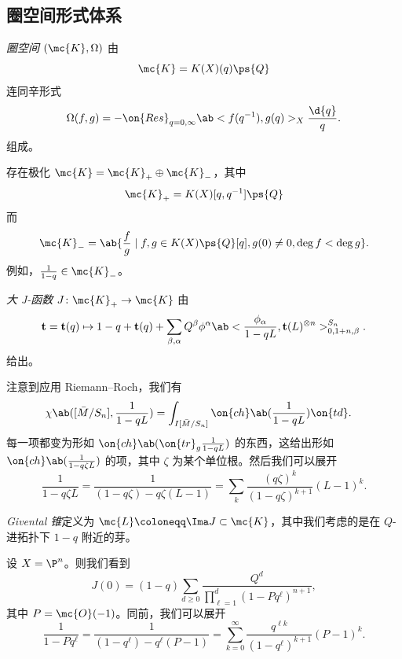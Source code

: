 \subsection{圈空间形式体系}%
\label{sub:Loop space formalism}

\begin{defn}
    \textit{圈空间} \((\mc{K}, \Omega)\) 由
    \[ \mc{K} = K(X)(q) \ps{Q}\]
    连同辛形式
    \[ \Omega(f, g) = - \on{Res}_{q = 0, \infty} \ab<f(q^{-1}), g(q)>_X \frac{\d{q}}{q}. \]
    组成。
\end{defn}

\begin{rmk}
    存在极化 \(\mc{K} = \mc{K}_+ \oplus \mc{K}_-\)，其中
    \[ \mc{K}_+ = K(X)[q, q^{-1}]\ps{Q} \]
    而
    \[ \mc{K}_- = \ab\{ \frac{f}{g} \mid f, g \in K(X)\ps{Q}[q], g(0) \neq 0, \deg f < \deg g\}. \]
    例如，\(\frac{1}{1-q} \in \mc{K}_-\)。
\end{rmk}

\begin{defn}
    \textit{大 J-函数} \(J \colon \mc{K}_+ \to \mc{K}\) 由
    \[ \mathbf{t} = \mathbf{t}(q) \mapsto 1 - q + \mathbf{t}(q) + \sum_{\beta, \alpha} Q^{\beta} \phi^{\alpha} \ab< \frac{\phi_{\alpha}}{1-qL}, \mathbf{t}(L)^{\otimes n}>_{0, 1+n, \beta}^{S_n}. \]
    给出。
\end{defn}

\begin{rmk}
    注意到应用 Riemann–Roch，我们有
    \begin{align*}
        \chi\ab([\bar{M}/S_n], \frac{1}{1-qL}) &= \int_{I[\bar{M}/S_n]} \on{ch}\ab(\frac{1}{1-qL}) \on{td}.
    \end{align*}
    每一项都变为形如 \(\on{ch}\ab(\on{tr}_g \frac{1}{1-qL})\) 的东西，这给出形如 \(\on{ch}\ab(\frac{1}{1-q\zeta L})\) 的项，其中 \(\zeta\) 为某个单位根。然后我们可以展开
    \[ \frac{1}{1-q\zeta L} = \frac{1}{(1-q \zeta) - q\zeta (L-1)} = \sum_k \frac{(q\zeta)^k}{(1-q\zeta)^{k+1}}(L-1)^k. \]
\end{rmk}

\begin{defn}
    \textit{Givental 锥}定义为 \(\mc{L} \coloneqq \Ima J \subset \mc{K}\)，其中我们考虑的是在 \(Q\)-进拓扑下 \(1-q\) 附近的芽。
\end{defn}

\begin{exm}
    设 \(X = \P^n\)。则我们看到
    \[ J(0) = (1-q) \sum_{d \geq 0} \frac{Q^d}{\prod_{\ell=1}^d (1-Pq^{\ell})^{n+1}}, \]
    其中 \(P = \mc{O}(-1)\)。同前，我们可以展开
    \[ \frac{1}{1-P q^{\ell}} = \frac{1}{(1-q^{\ell}) - q^{\ell}(P-1)} = \sum_{k=0}^{\infty} \frac{q^{\ell k}}{(1-q^{\ell})^{k+1}}(P-1)^k. \]
\end{exm}

